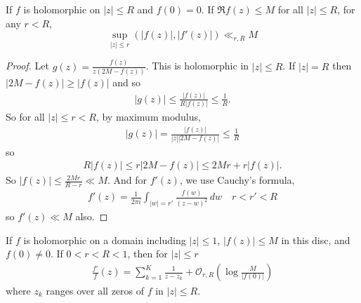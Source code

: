 \documentclass{article}
\newcommand{\1}{\mathbbm{1}}
\newcommand{\bigO}{\mathcal{O}}
\begin{document}
\begin{lemma}
  If $f$ is holomorphic on $|z| \leq R$ and $f(0) = 0$.
  If $\Re f(z) \leq M$ for all $|z| \leq R$, for any $r < R$,
  \begin{equation*}
    \sup_{|z| \leq r} (|f(z)|, |f'(z)|) \ll_{r,R} M
  \end{equation*}
\end{lemma}
\begin{proof}
  Let $g(z) = \frac{f(z)}{z(2M-f(z))}$. This is holomorphic in $|z| \leq R$.
  If $|z| = R$ then $|2M-f(z)| \geq |f(z)|$ and so
  \begin{align*}
    |g(z)| \leq \frac{|f(z)|}{R |f(z)|} \leq \frac{1}{R}.
  \end{align*}
  So for all $|z| \leq r < R$, by maximum modulus,
  \begin{align*}
    |g(z)| = \frac{|f(z)|}{|z| |2M-f(z)|} \leq \frac{1}{R}
  \end{align*}
  so
  \begin{align*}
    R |f(z)| \leq r |2M-f(z)| \leq 2Mr + r |f(z)|.
  \end{align*}
  So $|f(z)| \leq \frac{2Mr}{R-r} \ll M$.
  And for $f'(z)$, we use Cauchy's formula,
  \begin{align*}
    f'(z) = \frac{1}{2 \pi i} \int_{|w|=r'} \frac{f(w)}{(z-w)^2}\,dw \quad r < r' < R
  \end{align*}
  so $f'(z) \ll M$ also.
\end{proof}
\begin{lemma}
  If $f$ is holomorphic on a domain including $|z| \leq 1$, $|f(z)| \leq M$ in this disc, and $f(0) \neq 0$. If $0 < r < R < 1$, then for $|z| \leq r$
  \begin{align*}
    \frac{f'}{f}(z) = \sum_{k=1}^K \frac{1}{z-z_k} + \bigO_{r,R}\left(\log \frac{M}{|f(0)|}\right)
  \end{align*}
  where $z_k$ ranges over all zeros of $f$ in $|z| \leq R$.
\end{lemma}
\end{document}
